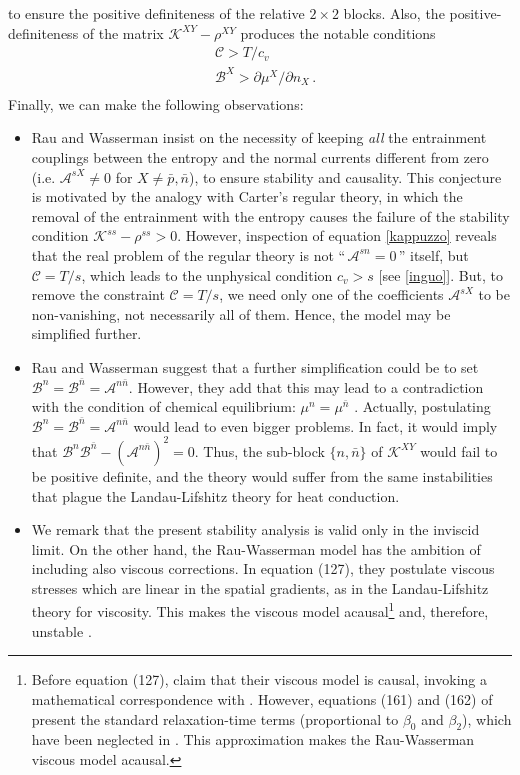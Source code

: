 \documentclass[a4paper, amsfonts, amssymb, amsmath, reprint, showkeys, nofootinbib, twoside, onecolumn,notitlepage]{revtex4-1}
\theoremstyle{definition}
\theoremstyle{theorem}
\begin{document}
to ensure the positive definiteness of the relative $2 \times 2$ blocks. Also, the positive-definiteness of the matrix $\mathcal{K}^{XY}-\rho^{XY}$ produces the notable conditions
\begin{equation}\label{inguo}
\begin{split}
& \mathcal{C}> T/c_v \\
& \mathcal{B}^X > \partial \mu^X /\partial n_X \, . \\
\end{split}
\end{equation}
Finally, we can make the following observations:
\begin{itemize}
\item Rau and Wasserman insist on the necessity of keeping \textit{all} the entrainment couplings between the entropy and the normal currents different from zero (i.e. $\mathcal{A}^{sX}\neq 0$ for $X\neq\bar{p},\bar{n}$), to ensure stability and causality. This conjecture is motivated by the analogy with Carter's regular theory, in which the removal of the entrainment with the entropy causes the failure of the stability condition $\mathcal{K}^{ss}-\rho^{ss}>0$. However, inspection of equation \eqref{kappuzzo} reveals that the real problem of the regular theory is not ``$\, \mathcal{A}^{sn}=0 \,$'' itself, but $\mathcal{C}=T/s$, which leads to the unphysical condition $c_v >s$ [see \eqref{inguo}]. But, to remove the constraint $\mathcal{C}=T/s$, we need only one of the coefficients $\mathcal{A}^{sX}$ to be non-vanishing, not necessarily all of them. Hence, the model may be simplified further.
\item Rau and Wasserman suggest that a further simplification could be to set $\mathcal{B}^n=\mathcal{B}^{\bar{n}}=\mathcal{A}^{n\bar{n}}$. However, they add that this may lead to a contradiction with the condition of chemical equilibrium: $\mu^n = \mu^{\bar{n}}$ \cite{carter92}. Actually, postulating $\mathcal{B}^n=\mathcal{B}^{\bar{n}}=\mathcal{A}^{n\bar{n}}$ would lead to even bigger problems. In fact, it would imply that $\mathcal{B}^n\mathcal{B}^{\bar{n}}-(\mathcal{A}^{n\bar{n}})^2=0$. Thus, the sub-block $\{ n, \bar{n}\}$ of $\mathcal{K}^{XY}$ would fail to be positive definite, and the theory would suffer from the same instabilities that plague the Landau-Lifshitz theory for heat conduction. 
\item We remark that the present stability analysis is valid only in the inviscid limit. On the other hand, the Rau-Wasserman model \cite{RauWasserman2020} has the ambition of including also viscous corrections. In equation (127), they postulate viscous stresses which are linear in the spatial gradients, as in the Landau-Lifshitz theory for viscosity. This makes the viscous model acausal\footnote{Before equation (127), \citet{RauWasserman2020} claim that their viscous model is causal, invoking a mathematical correspondence with \cite{PriouCOMPAR1991}. However, equations (161) and (162) of \cite{PriouCOMPAR1991} present the standard relaxation-time terms (proportional to $\beta_0$ and $\beta_2$), which have been neglected in \cite{RauWasserman2020}. This approximation makes the Rau-Wasserman viscous model acausal.} and, therefore, unstable \cite{GavassinoSuperluminal2021}. 
\end{itemize}
\end{document}
